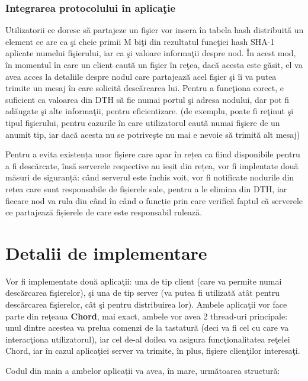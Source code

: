 \documentclass[runningheads]{llncs}
\begin{document}
\subsubsection{Integrarea protocolului în aplicaţie}

Utilizatorii ce doresc să partajeze un fişier vor insera în tabela hash distribuită un element ce are ca şi cheie primii M biţi din rezultatul funcţiei hash SHA-1 aplicate numelui fişierului, iar ca şi valoare informaţii despre nod. În acest mod, în momentul în care un client caută un fişier în reţea, dacă acesta este găsit, el va avea acces la detaliile despre nodul care partajează acel fişier şi îi va putea trimite un mesaj în care solicită descărcarea lui. Pentru a funcţiona corect, e suficient ca valoarea din DTH să fie numai portul şi adresa nodului, dar pot fi adăugate şi alte informaţii, pentru eficientizare. (de exemplu, poate fi reţinut şi tipul fişierului, pentru cazurile în care utilizatorul caută numai fişiere de un anumit tip, iar dacă acesta nu se potriveşte nu mai e nevoie să trimită alt mesaj)

Pentru a evita existența unor fișiere care apar în rețea ca fiind disponibile pentru a fi descărcate, însă serverele respective au ieșit din rețea, vor fi implentate două măsuri de siguranță: când serverul este închis voit, vor fi notificate nodurile din rețea care sunt responsabile de fișierele sale, pentru a le elimina din DTH, iar fiecare nod va rula din când în când o funcție prin care verifică faptul că serverele ce partajează fișierele de care este responsabil rulează.

\section{Detalii de implementare}

Vor fi implementate două aplicaţii: una de tip client (care va permite numai descărcarea fişierelor), şi una de tip server (va putea fi utilizată atât pentru descărcarea fişierelor, cât şi pentru distribuirea lor). Ambele aplicaţii vor face parte din reţeaua \textbf{Chord}, mai exact, ambele vor avea 2 thread-uri principale: unul dintre acestea va prelua comenzi de la tastatură (deci va fi cel cu care va interacţiona utilizatorul), iar cel de-al doilea va asigura funcţionalitatea reţelei Chord, iar în cazul aplicaţiei server va trimite, în plus, fişiere clienţilor interesaţi.

Codul din main a ambelor aplicații va avea, în mare, următoarea structură:
\end{document}
